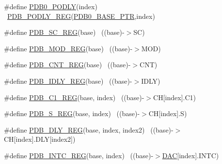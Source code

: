 \begin{DoxyCompactItemize}
\item 
\#define \hyperlink{group___p_d_b___register___accessor___macros_ga4c603d9ef0923897a580a84d7d6bb25c}{P\+D\+B0\+\_\+\+P\+O\+D\+LY}(index)                                            ~\hyperlink{group___p_d_b___register___accessor___macros_ga1a504420e9fb58b269c0de37e133532c}{P\+D\+B\+\_\+\+P\+O\+D\+L\+Y\+\_\+\+R\+EG}(\hyperlink{group___p_d_b___peripheral_ga8e197b7c43fd7a0bf1a38caa1918b7b5}{P\+D\+B0\+\_\+\+B\+A\+S\+E\+\_\+\+P\+TR},index)
\item 
\#define \hyperlink{group___p_d_b___register___accessor___macros_ga1591bd73f684fdc755e12eef3d570734}{P\+D\+B\+\_\+\+S\+C\+\_\+\+R\+EG}(base)                                              ~((base)-\/$>$SC)
\item 
\#define \hyperlink{group___p_d_b___register___accessor___macros_ga8c8a28c2bc66773f6820aaa1badaffcc}{P\+D\+B\+\_\+\+M\+O\+D\+\_\+\+R\+EG}(base)                                            ~((base)-\/$>$M\+OD)
\item 
\#define \hyperlink{group___p_d_b___register___accessor___macros_ga3bc07ddecbb4c1fe42bb5953e703cca0}{P\+D\+B\+\_\+\+C\+N\+T\+\_\+\+R\+EG}(base)                                            ~((base)-\/$>$C\+NT)
\item 
\#define \hyperlink{group___p_d_b___register___accessor___macros_ga117aa5730c78ef78a2c18f49cf9a7663}{P\+D\+B\+\_\+\+I\+D\+L\+Y\+\_\+\+R\+EG}(base)                                          ~((base)-\/$>$I\+D\+LY)
\item 
\#define \hyperlink{group___p_d_b___register___accessor___macros_ga5786cd17977be8e085fe0157ec4c15fe}{P\+D\+B\+\_\+\+C1\+\_\+\+R\+EG}(base,  index)                                  ~((base)-\/$>$CH\mbox{[}index\mbox{]}.C1)
\item 
\#define \hyperlink{group___p_d_b___register___accessor___macros_gacae2553354248e45352a2dbee463e62d}{P\+D\+B\+\_\+\+S\+\_\+\+R\+EG}(base,  index)                                    ~((base)-\/$>$CH\mbox{[}index\mbox{]}.S)
\item 
\#define \hyperlink{group___p_d_b___register___accessor___macros_ga2b72a7c3b1604a38397358fd0b271851}{P\+D\+B\+\_\+\+D\+L\+Y\+\_\+\+R\+EG}(base,  index,  index2)                  ~((base)-\/$>$CH\mbox{[}index\mbox{]}.D\+LY\mbox{[}index2\mbox{]})
\item 
\#define \hyperlink{group___p_d_b___register___accessor___macros_ga872dcab8e3d15a466c56e2f7fb3d33e2}{P\+D\+B\+\_\+\+I\+N\+T\+C\+\_\+\+R\+EG}(base,  index)                              ~((base)-\/$>$\hyperlink{group___peripheral__declaration_ga4aa2a4ab86ce00c23035e5cee2e7fc7e}{D\+AC}\mbox{[}index\mbox{]}.I\+N\+TC)

\end{DoxyCompactItemize}
